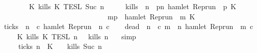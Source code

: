 \begin{isabellebody}
{}\isanewline
\ \ \ \ \ \ {\isasyminter}\ {\isasymlbrakk}\ K\ kills\ K\ {\isasymrbrakk}\isactrlsub T\isactrlsub E\isactrlsub S\isactrlsub L\isactrlbsup {\isasymge}\ Suc\ n\isactrlesup {\isacartoucheclose}\isanewline
%
\isadelimproof
%
\endisadelimproof
%
\isatagproof
{}\isamarkupfalse%
\ {\isacharminus}\isanewline
\ \ \isamarkupfalse%
\ {\isacharquery}kills\ {\isacharequal}\ {\isacartoucheopen}{\isasymlambda}n\ {\isasymrho}{\isachardot}\ {\isasymforall}p{\isasymge}n{\isachardot}\ hamlet\ {\isacharparenleft}{\isacharparenleft}Rep{\isacharunderscore}run\ {\isasymrho}{\isacharparenright}\ p\ K\isanewline
\ \ \ \ \ \ \ \ \ \ \ \ \ \ \ \ \ \ \ \ \ \ \ \ \ \ \ \ \ {\isasymlongrightarrow}\ {\isacharparenleft}{\isasymforall}m{\isasymge}p{\isachardot}\ {\isasymnot}\ hamlet\ {\isacharparenleft}{\isacharparenleft}Rep{\isacharunderscore}run\ {\isasymrho}{\isacharparenright}\ m\ K\isanewline
\ \ \isamarkupfalse%
\ {\isacharquery}ticks\ {\isacharequal}\ {\isacartoucheopen}{\isasymlambda}n\ {\isasymrho}\ c{\isachardot}\ hamlet\ {\isacharparenleft}{\isacharparenleft}Rep{\isacharunderscore}run\ {\isasymrho}{\isacharparenright}\ n\ c{\isacharparenright}{\isacartoucheclose}\isanewline
\ \ \isamarkupfalse%
\ {\isacharquery}dead\ {\isacharequal}\ {\isacartoucheopen}{\isasymlambda}n\ {\isasymrho}\ c{\isachardot}\ {\isasymforall}m\ {\isasymge}\ n{\isachardot}\ {\isasymnot}hamlet\ {\isacharparenleft}{\isacharparenleft}Rep{\isacharunderscore}run\ {\isasymrho}{\isacharparenright}\ m\ c{\isacharparenright}{\isacartoucheclose}\isanewline
\ \ \isamarkupfalse%
\ {\isacartoucheopen}{\isasymlbrakk}\ K\ kills\ K\ {\isasymrbrakk}\isactrlsub T\isactrlsub E\isactrlsub S\isactrlsub L\isactrlbsup {\isasymge}\ n\isactrlesup \ {\isacharequal}\ {\isacharbraceleft}{\isasymrho}{\isachardot}\ {\isacharquery}kills\ n\ {\isasymrho}{\isacharbraceright}{\isacartoucheclose}\ \isamarkupfalse%
\ simp\isanewline
\ \ \isamarkupfalse%
\ \isamarkupfalse%
\ {\isacartoucheopen}{\isachardot}{\isachardot}{\isachardot}\ {\isacharequal}\ {\isacharparenleft}{\isacharbraceleft}{\isasymrho}{\isachardot}\ {\isasymnot}\ {\isacharquery}ticks\ n\ {\isasymrho}\ K\ \ {\isasyminter}\ {\isacharbraceleft}{\isasymrho}{\isachardot}\ {\isacharquery}kills\ {\isacharparenleft}Suc\ n{\isacharparenright}\ {\isasymrho}{\isacharbraceright}{\isacharparenright}\isanewline

\end{isabellebody}
